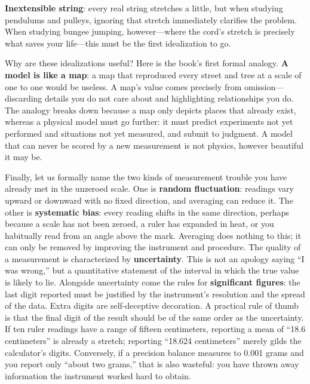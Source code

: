 \textbf{Inextensible string}: every real string stretches a little, but when studying pendulums and pulleys, ignoring that stretch immediately clarifies the problem. When studying bungee jumping, however---where the cord's stretch is precisely what saves your life---this must be the first idealization to go.

Why are these idealizations useful? Here is the book's first formal analogy. \textbf{A model is like a map}: a map that reproduced every street and tree at a scale of one to one would be useless. A map's value comes precisely from omission---discarding details you do not care about and highlighting relationships you do. The analogy breaks down because a map only depicts places that already exist, whereas a physical model must go further: it must predict experiments not yet performed and situations not yet measured, and submit to judgment. A model that can never be scored by a new measurement is not physics, however beautiful it may be.

Finally, let us formally name the two kinds of measurement trouble you have already met in the unzeroed scale. One is \textbf{random fluctuation}: readings vary upward or downward with no fixed direction, and averaging can reduce it. The other is \textbf{systematic bias}: every reading shifts in the same direction, perhaps because a scale has not been zeroed, a ruler has expanded in heat, or you habitually read from an angle above the mark. Averaging does nothing to this; it can only be removed by improving the instrument and procedure. The quality of a measurement is characterized by \textbf{uncertainty}. This is not an apology saying ``I was wrong,'' but a quantitative statement of the interval in which the true value is likely to lie. Alongside uncertainty come the rules for \textbf{significant figures}: the last digit reported must be justified by the instrument's resolution and the spread of the data. Extra digits are self-deceptive decoration. A practical rule of thumb is that the final digit of the result should be of the same order as the uncertainty. If ten ruler readings have a range of fifteen centimeters, reporting a mean of ``18.6 centimeters'' is already a stretch; reporting ``18.624 centimeters'' merely gilds the calculator's digits. Conversely, if a precision balance measures to 0.001 grams and you report only ``about two grams,'' that is also wasteful: you have thrown away information the instrument worked hard to obtain.



